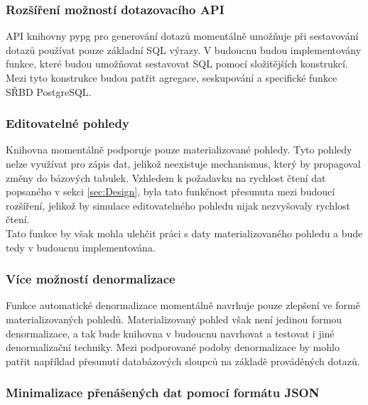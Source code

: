 \documentclass[ing,male,java,dept456]{diploma}						%
\begin{document}
\subsubsection{Rozšíření možností dotazovacího API}

API knihovny pypg pro generování dotazů momentálně umožňuje při sestavování dotazů používat pouze základní SQL výrazy. V budoucnu budou implementovány funkce, které budou umožňovat sestavovat SQL pomocí složitějších konstrukcí. Mezi tyto konstrukce budou patřit agregace, seskupování a specifické funkce SŘBD PostgreSQL.

\subsubsection{Editovatelné pohledy}

Knihovna momentálně podporuje pouze materializované pohledy. Tyto pohledy nelze využívat pro zápis dat, jelikož neexistuje mechanismus, který by propagoval změny do bázových tabulek. Vzhledem k požadavku na rychlost čtení dat popsaného v sekci \ref{sec:Design}, byla tato funkčnost přesunuta mezi budoucí rozšíření, jelikož by simulace editovatelného pohledu nijak nezvyšovaly rychlost čtení. \\
Tato funkce by však mohla ulehčit práci s daty materializovaného pohledu a bude tedy v budoucnu implementována.

\subsubsection{Více možností denormalizace}

Funkce automatické denormalizace momentálně navrhuje pouze zlepšení ve formě materializovaných pohledů. Materializovaný pohled však není jedinou formou denormalizace, a tak bude knihovna v budoucnu navrhovat a testovat i jiné denormalizační techniky. Mezi podporované podoby denormalizace by mohlo patřit například přesunutí databázových sloupců na základě prováděných dotazů.

\subsubsection{Minimalizace přenášených dat pomocí formátu JSON}
\end{document}
